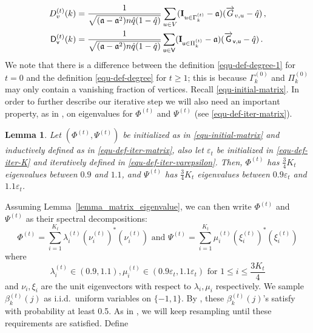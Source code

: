\documentclass[11pt]{article}
\newtheorem{Lemma}[Theorem]{Lemma}
\numberwithin{equation}{section}
\begin{document}
\begin{equation}
    \begin{aligned}
        D^{(t)}_v(k) &= \frac{1}{\sqrt{( \mathfrak{a} - \mathfrak{a}^2)n \Hat{q}(1-\Hat{q})}} \sum_{u \in V}( \mathbf{I}_{u \in \Gamma^{(t)}_k} - \mathfrak{a}) (\overrightarrow{G}_{v,u}-\Hat{q})\,, \\
        \mathsf{D}^{(t)}_{\mathsf{v}}(k) &= \frac{1}{\sqrt{(\mathfrak{a}-\mathfrak{a}^2)n \Hat{q}(1-\Hat{q})}} \sum_{\mathsf{u} \in \mathsf{V} }(\mathbf{I}_{\mathsf{u} \in \Pi^{(t)}_k} -\mathfrak{a}) (\overrightarrow{\mathsf{G}}_{\mathsf{v,u}}- \Hat{q})\,.
        \label{equ-def-degree}
    \end{aligned}
\end{equation}
We  note that there is a difference between the definition \eqref{equ-def-degree-1} for $t = 0$ and the definition \eqref{equ-def-degree} for $t\geq 1$;  this is because $\Gamma^{(0)}_k$ and $\Pi^{(0)}_k$ may only contain a vanishing fraction of vertices.
Recall \eqref{equ-initial-matrix}. In order to further describe our iterative step we will also need an important property, as in  \cite[Lemma 2.1]{DL22+}, on eigenvalues for $\Phi^{(t)}$ and $\Psi^{(t)}$ (see \eqref{equ-def-iter-matrix}). 
\begin{Lemma}{\label{lemma_matrix_eigenvalue}}
Let $(\Phi^{(t)}, \Psi^{(t)})$ be initialized as in \eqref{equ-initial-matrix} and inductively defined as in \eqref{equ-def-iter-matrix}, also let $\varepsilon_t$ be initialized in \eqref{equ-def-iter-K} and iteratively defined in \eqref{equ-def-iter-varepsilon}. Then, $\Phi^{(t)}$ has $\frac{3}{4}K_t$ eigenvalues between $0.9$ and $1.1$, and $\Psi^{(t)}$ has $\frac{3}{4}K_t$ eigenvalues between $ 0.9 \varepsilon_t$ and $1.1 \varepsilon_t$.
\end{Lemma}
Assuming Lemma~\ref{lemma_matrix_eigenvalue}, we can then write $\Phi^{(t)}$ and $\Psi^{(t)}$ as their spectral decompositions:
\begin{equation}
    \label{eq-spectral-decomposition}
    \Phi^{(t)}=\sum^{K_t}_{i=1} \lambda^{(t)}_i
    \left({\nu^{(t)}_i} \right)^{*} \left(\nu^{(t)}_i \right) \mbox{ and }
    \Psi^{(t)}= \sum_{i=1}^{K_t} \mu^{(t)}_i \left({\xi^{(t)}_i} \right)^{*} \left(\xi^{(t)}_i \right)
\end{equation}
where 
\begin{equation}
    \label{eq-lambda-mu-bound}
    \lambda^{(t)}_i \in (0.9,1.1), \mu^{(t)}_i \in ( 0.9 \varepsilon_t, 1.1 \varepsilon_t ) \mbox{ for } 1 \leq i \leq \frac{3K_t}{4}
\end{equation} and $\nu_i,\xi_i$ are the unit eigenvectors with respect to $\lambda_i,\mu_i$ respectively. We sample $\beta^{(t)}_k(j)$ as i.i.d.\ uniform variables on $\{-1, 1\}$. By \cite[Proposition 2.4]{DL22+},  these $\beta^{(t)}_k(j)$'s satisfy  \cite[(2.21)--(2.24)]{DL22+} with probability at least 0.5. As in \cite{DL22+}, we will keep resampling until these requirements are satisfied. Define
\end{document}
